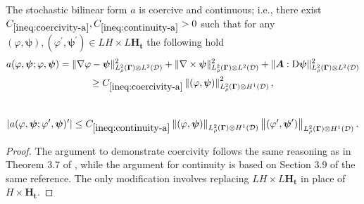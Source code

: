 \documentclass[final,onefignum,onetabnum]{mousaviart}
\begin{document}
	\vspace*{1mm}
	\begin{lemma}
		\label{lem:well-posedness-a-y}
		The stochastic bilinear form $a$ is coercive and continuous; i.e., there exist $C_{\ref{ineq:coercivity-a}}, C_{\ref{ineq:continuity-a}}> 0$ such that for 
		any $(\varphi, \boldsymbol{\psi}), (\varphi^{\prime}, \boldsymbol{\psi}^{\prime}) \in LH \times L\boldsymbol{H}_{\boldsymbol{t}}$ the following hold
		\begin{multline}
			\label{ineq:coercivity-a}
			a (\varphi, \boldsymbol{\psi}; \varphi, \boldsymbol{\psi}) = 
			\lVert \nabla \varphi - \boldsymbol{\psi} \rVert^2_{L^2_\rho(\boldsymbol{\Gamma}) \otimes L^2(\mathcal{D})}
			+
			\lVert \nabla \times \boldsymbol{\psi} \rVert^2_{L^2_\rho(\boldsymbol{\Gamma}) \otimes L^2(\mathcal{D})} 
			+
			\lVert \boldsymbol{A} : \mathrm{D}  \boldsymbol{\psi} \rVert_{L^2_\rho(\boldsymbol{\Gamma}) \otimes L^2(\mathcal{D})}^2
			\\
			\geq
			C_{\ref{ineq:coercivity-a}}
			\left\| (\varphi, \boldsymbol{\psi})  \right\| ^2_{ L^2_\rho(\boldsymbol{\Gamma}) \otimes H^1(\mathcal{D}) }
			,
		\end{multline}
		\\
		\vspace*{-1.2cm}
		\begin{equation}
			\label{ineq:continuity-a}
			\left|  a (\varphi, \boldsymbol{\psi}; \varphi^\prime, \boldsymbol{\psi})^\prime \right| 
			\leq
			C_{\ref{ineq:continuity-a}}
			\left\|  (\varphi, \boldsymbol{\psi}) \right\|_{
				L^2_\rho(\boldsymbol{\Gamma}) \otimes H^1(\mathcal{D}) } 
			\left\|  (\varphi^{\prime}, \boldsymbol{\psi}^\prime) \right\|_{   L^2_\rho(\boldsymbol{\Gamma}) \otimes H^1(\mathcal{D})
			}.
		\end{equation}
	\end{lemma}
	
	\vspace*{1mm}
	\begin{proof}
		The argument to demonstrate coercivity follows the same reasoning as in Theorem 3.7 of \cite{Lakkis-Mousavi}, while the argument for continuity is based on Section 3.9 of the same reference. The only modification involves replacing $LH \times L\boldsymbol{H}_{\boldsymbol{t}}$ in place of $H \times \boldsymbol{H}_{\boldsymbol{t}}$.
	\end{proof}
	
\end{document}
